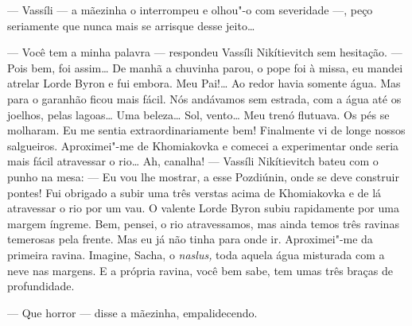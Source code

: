 --- Vassíli --- a mãezinha o interrompeu e olhou"-o com severidade ---,
peço seriamente que nunca mais se arrisque desse jeito\ldots{}

--- Você tem a minha palavra --- respondeu Vassíli Nikítievitch sem
hesitação. --- Pois bem, foi assim\ldots{} De manhã a chuvinha parou, o pope
foi à missa, eu mandei atrelar Lorde Byron e fui embora. Meu Pai!\ldots{} Ao
redor havia somente água. Mas para o garanhão ficou mais fácil. Nós
andávamos sem estrada, com a água até os joelhos, pelas lagoas\ldots{} Uma
beleza\ldots{} Sol, vento\ldots{} Meu trenó flutuava. Os pés se molharam. Eu me
sentia extraordinariamente bem! Finalmente vi de longe nossos
salgueiros. Aproximei"-me de Khomiakovka e comecei a experimentar onde
seria mais fácil atravessar o rio\ldots{} Ah, canalha! --- Vassíli
Nikítievitch bateu com o punho na mesa: --- Eu vou lhe mostrar, a esse
Pozdiúnin, onde se deve construir pontes! Fui obrigado a subir uma três
verstas acima de Khomiakovka e de lá atravessar o rio por um vau. O
valente Lorde Byron subiu rapidamente por uma margem íngreme. Bem,
pensei, o rio atravessamos, mas ainda temos três ravinas temerosas pela
frente. Mas eu já não tinha para onde ir. Aproximei"-me da primeira
ravina. Imagine, Sacha, o \emph{naslus,} toda aquela água misturada com
a neve nas margens. E a própria ravina, você bem sabe, tem umas três
braças de profundidade.

--- Que horror --- disse a mãezinha, empalidecendo.

